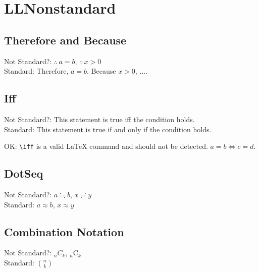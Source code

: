 \section{LLNonstandard}

\subsection{Therefore and Because}

Not Standard?: \(\therefore \, a = b\), \(\because \, x > 0\)\\
Standard: Therefore, \(a = b\). Because \(x > 0\), \(\ldots\).


\subsection{Iff}

Not Standard?: This statement is true iff the condition holds.\\
Standard: This statement is true if and only if the condition holds.

OK: \verb|\iff| is a valid LaTeX command and should not be detected.
\(a = b \iff c = d\).

\subsection{DotSeq}

Not Standard?: \(a \fallingdotseq b\), \(x \risingdotseq y\)\\
Standard: \(a \approx b\), \(x \approx y\)

\subsection{Combination Notation}

Not Standard?: \({}_n C_k\), \({}_n \mathrm{C}_k\)\\
Standard: \(\binom{n}{k}\)
